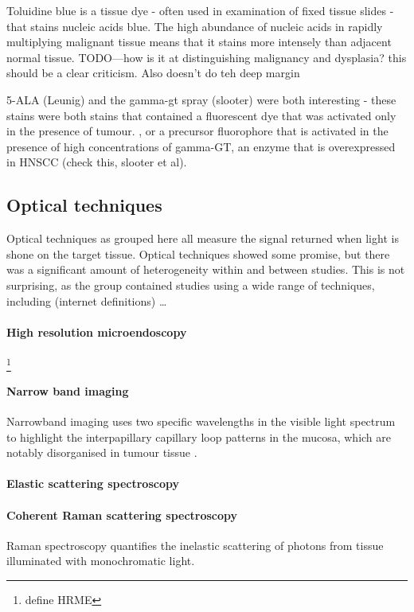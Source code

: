 Toluidine blue is a tissue dye - often used in examination of fixed tissue slides - that stains nucleic acids blue.
The high abundance of nucleic acids in rapidly multiplying malignant tissue means that it stains more intensely than adjacent normal tissue.
TODO---how is it at distinguishing malignancy and dysplasia? this should be a clear criticism. 
Also doesn't do teh deep margin

5-ALA (Leunig) and the gamma-gt spray (slooter) were both interesting - these stains were both stains that contained a fluorescent dye that was activated only in the presence of tumour. 
, or a precursor fluorophore that is activated in the presence of high concentrations of gamma-GT, an enzyme that is overexpressed in HNSCC (check this, slooter et al).

\subsection{Optical techniques}

Optical techniques as grouped here all measure the signal returned when light is shone on the target tissue.
Optical techniques showed some promise, but there was a significant amount of heterogeneity within and between studies. 
This is not surprising, as the group contained studies using a wide range of techniques, including (internet definitions) \ldots

\paragraph{High resolution microendoscopy} \cite{vilap.m.DiscriminationBenignNeoplastic2012, milesb.a.OperativeMarginControl2015}\footnote{define HRME}
\paragraph{Narrow band imaging} \cite{tirelliNarrowBandImaging2015, tirellig.TailoredResectionsOral2018}Narrowband imaging uses two specific wavelengths in the visible light spectrum to highlight the interpapillary capillary loop patterns in the mucosa, which are notably disorganised in tumour tissue \cite{vuEfficacyNarrowBand2014}.
\paragraph{Elastic scattering spectroscopy} \cite{grilloneg.a.ColorCancerMargin2017}
\paragraph{Coherent Raman scattering spectroscopy} \cite{hoeslir.c.CoherentRamanScattering2017} Raman spectroscopy quantifies the inelastic scattering of photons from tissue illuminated with monochromatic light.
